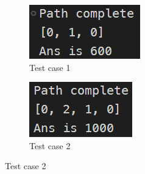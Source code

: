 \documentclass[a4paper, 11pt]{article}
\begin{document}
\begin{figure}[h]
  \centering
  \begin{subfigure}{.45\linewidth}
      \centering
      \includegraphics[width=\textwidth,height=\textheight,keepaspectratio]{res_1.png}
      \caption{Test case 1}
  \end{subfigure}
      \hfill
  \begin{subfigure}{.45\linewidth}
      \centering
      \includegraphics[width=\textwidth,height=\textheight,keepaspectratio]{res_2.png}
      \caption{Test case 2}
  \end{subfigure}
 

\end{figure}
\end{document}
